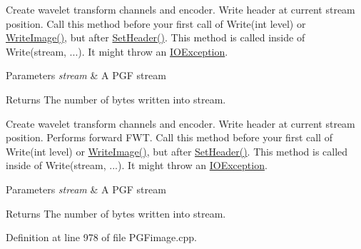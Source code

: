 Create wavelet transform channels and encoder. Write header at current stream position. Call this method before your first call of Write(int level) or \mbox{\hyperlink{classCPGFImage_a0f0657eaf1a62ab14c01834e5c7adb07}{Write\+Image()}}, but after \mbox{\hyperlink{classCPGFImage_a200790d3be292a19fe8cbdd78ddfc386}{Set\+Header()}}. This method is called inside of Write(stream, ...). It might throw an \mbox{\hyperlink{structIOException}{I\+O\+Exception}}. 
\begin{DoxyParams}{Parameters}
{\em stream} & A P\+GF stream \\
\hline
\end{DoxyParams}
\begin{DoxyReturn}{Returns}
The number of bytes written into stream.
\end{DoxyReturn}
Create wavelet transform channels and encoder. Write header at current stream position. Performs forward F\+WT. Call this method before your first call of Write(int level) or \mbox{\hyperlink{classCPGFImage_a0f0657eaf1a62ab14c01834e5c7adb07}{Write\+Image()}}, but after \mbox{\hyperlink{classCPGFImage_a200790d3be292a19fe8cbdd78ddfc386}{Set\+Header()}}. This method is called inside of Write(stream, ...). It might throw an \mbox{\hyperlink{structIOException}{I\+O\+Exception}}. 
\begin{DoxyParams}{Parameters}
{\em stream} & A P\+GF stream \\
\hline
\end{DoxyParams}
\begin{DoxyReturn}{Returns}
The number of bytes written into stream. 
\end{DoxyReturn}


Definition at line 978 of file P\+G\+Fimage.\+cpp.


